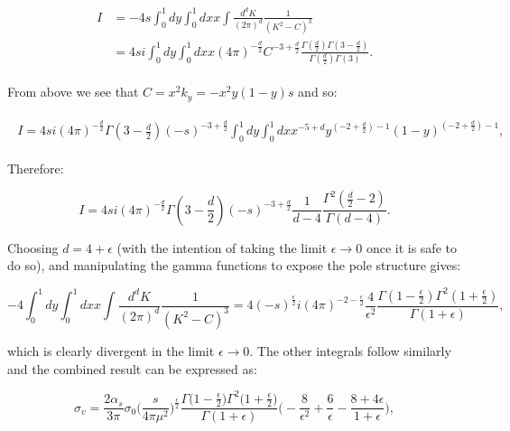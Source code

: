 			\begin{align}
			\begin{split}
				 I &= -4s\int_0^1dy\int_0^1dxx\int\frac{d^{d}K}{(2\pi)^d}\frac{1}{(K^2-C)^3} \\
				 &= 4si\int_0^1dy\int_0^1dxx(4\pi)^{-\frac{d}{2}}
				C^{-3+\frac{d}{2}}\frac{\Gamma(\frac{d}{2})\Gamma(3-\frac{d}{2})}{\Gamma(\frac{d}{2})\Gamma(3)}.
			\end{split}
			\end{align}

			From above we see that $C=x^2k_y=-x^2y(1-y)s$ and so:

			\begin{align}
			\begin{split}
				I = 4si(4\pi)^{-\frac{d}{2}}\Gamma(3-\frac{d}{2})(-s)^{-3+\frac{d}{2}}\int_0^1dy\int_0^1dxx^{-5+d}
				y^{\left(-2+\frac{d}{2}\right)-1}(1-y)^{\left(-2+\frac{d}{2}\right)-1},
			\end{split}
			\end{align}

			Therefore:

			\begin{equation}
				I = 4si(4\pi)^{-\frac{d}{2}}\Gamma\left(3-\frac{d}{2}\right)(-s)^{-3+\frac{d}{2}}
				\frac{1}{d-4}\frac{\Gamma^2(\frac{d}{2}-2)}{\Gamma(d-4)}.
			\end{equation}

			Choosing $d=4+\epsilon$ (with the intention of taking the limit $\epsilon\rightarrow0$
			once it is safe to do so), and manipulating the gamma functions to expose the pole structure gives:

			\begin{equation}
				-4\int_0^1dy\int_0^1dxx\int\frac{d^{d}K}{(2\pi)^d}\frac{1}{(K^2-C)^3} = 4(-s)^{\frac{\epsilon}{2}}i(4\pi)^{-2-\frac{\epsilon}{2}}
				\frac{4}{\epsilon^2}\frac{\Gamma\left(1-\frac{\epsilon}{2}\right)\Gamma^2\left(1+\frac{\epsilon}{2}\right)}{\Gamma(1+\epsilon)},
			\end{equation}

			which is clearly divergent in the limit $\epsilon\to0$.  The other integrals follow similarly and
			the combined result can be expressed as:

			\begin{equation}
				\sigma_v = \frac{2\alpha_s}{3\pi}\sigma_0\Big(\frac{s}{4\pi\mu^2}\Big)^{\frac{\epsilon}{2}}\frac{\Gamma
				\Big(1-\frac{\epsilon}{2}\Big)\Gamma^2\Big(1+\frac{\epsilon}{2}\Big)}{\Gamma(1+\epsilon)}\Big(-\frac{8}{\epsilon^2} +
				\frac{6}{\epsilon} - \frac{8+4\epsilon}{1+\epsilon}\Big),
			\end{equation}


